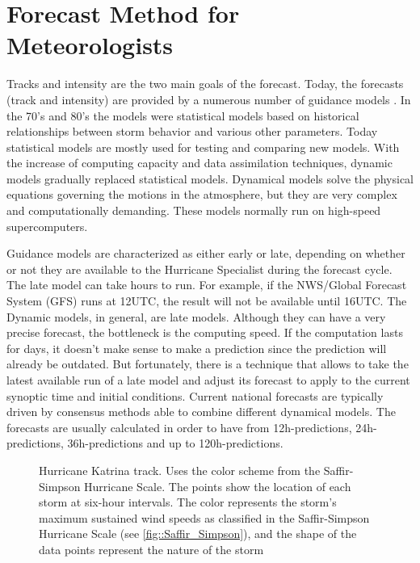 \section{Forecast Method for Meteorologists}
Tracks and intensity are the two main goals of the forecast. Today, the forecasts (track and intensity) are provided by a numerous number of guidance models \cite{nhc_models}. In the 70's and 80's the models were statistical models based on historical relationships between storm behavior and various other parameters\cite{demaria2005further}. Today statistical models are mostly used for testing and comparing new models. With the increase of computing capacity and data assimilation techniques, dynamic models gradually replaced statistical models. Dynamical models solve the physical equations governing the motions in the atmosphere, but they are very complex and computationally demanding. These models normally run on high-speed supercomputers. 

Guidance models are characterized as either early or late, depending on whether or not they are available to the Hurricane Specialist during the forecast cycle. \cite{nhc_models} The late model can take hours to run. For example, if the NWS/Global Forecast System (GFS) runs at 12UTC, the result will not be available until 16UTC. The Dynamic models, in general, are late models. Although they can have a very precise forecast, the bottleneck is the computing speed. If the computation lasts for days, it doesn't make sense to make a prediction since the prediction will already be outdated. But fortunately, there is a technique that allows to take the latest available run of a late model and adjust its forecast to apply to the current synoptic time and initial conditions\cite{nhc_models}. Current national forecasts are typically driven by consensus methods able to combine different dynamical models. The forecasts are usually calculated in order to have from 12h-predictions, 24h-predictions, 36h-predictions and up to 120h-predictions. 

\begin{figure}[t]
	\begin{center}
		\hsize {}
	\end{center}
	\caption{Hurricane Katrina track. Uses the color scheme from the Saffir-Simpson Hurricane Scale. The points show the location of each storm at six-hour intervals. The color represents the storm's maximum sustained wind speeds as classified in the Saffir-Simpson Hurricane Scale (see \ref{fig::Saffir_Simpson}), and the shape of the data points represent the nature of the storm \cite{katrina_track}}
	\label{fig:Katrina}
\end{figure}


